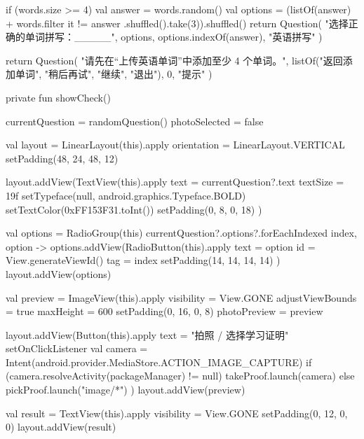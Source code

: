 {{        if (words.size >= 4) {
            val answer = words.random()
            val options = (listOf(answer) + words.filter { it != answer }.shuffled().take(3)).shuffled()
            return Question(
                "选择正确的单词拼写：_____",
                options,
                options.indexOf(answer),
                "英语拼写"
            )
        }

        return Question(
            "请先在“上传英语单词”中添加至少 4 个单词。",
            listOf("返回添加单词", "稍后再试", "继续", "退出"),
            0,
            "提示"
        )
    }

    private fun showCheck() {
        currentQuestion = randomQuestion()
        photoSelected = false

        val layout = LinearLayout(this).apply {
            orientation = LinearLayout.VERTICAL
            setPadding(48, 24, 48, 12)
        }

        layout.addView(TextView(this).apply {
            text = currentQuestion?.text
            textSize = 19f
            setTypeface(null, android.graphics.Typeface.BOLD)
            setTextColor(0xFF153F31.toInt())
            setPadding(0, 8, 0, 18)
        })

        val options = RadioGroup(this)
        currentQuestion?.options?.forEachIndexed { index, option ->
            options.addView(RadioButton(this).apply {
                text = option
                id = View.generateViewId()
                tag = index
                setPadding(14, 14, 14, 14)
            })
        }
        layout.addView(options)

        val preview = ImageView(this).apply {
            visibility = View.GONE
            adjustViewBounds = true
            maxHeight = 600
            setPadding(0, 16, 0, 8)
        }
        photoPreview = preview

        layout.addView(Button(this).apply {
            text = "拍照 / 选择学习证明"
            setOnClickListener {
                val camera = Intent(android.provider.MediaStore.ACTION_IMAGE_CAPTURE)
                if (camera.resolveActivity(packageManager) != null) {
                    takeProof.launch(camera)
                } else {
                    pickProof.launch("image/*")
                }
            }
        })
        layout.addView(preview)

        val result = TextView(this).apply {
            visibility = View.GONE
            setPadding(0, 12, 0, 0)
        }
        layout.addView(result)

}}
